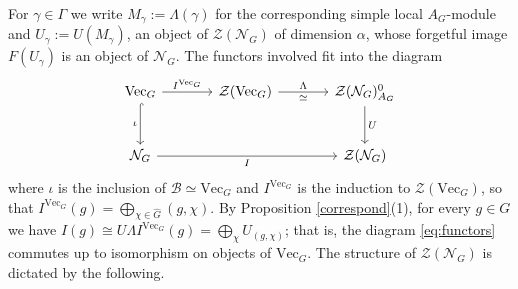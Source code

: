 \documentclass[10pt]{article}
\theoremstyle{plain}
\theoremstyle{definition}
\theoremstyle{plain}
\begin{document}
\par For $\gamma\in\Gamma$ we write $M_\gamma:=\Lambda(\gamma)$ for the corresponding simple local $A_G$-module and $U_\gamma:=U(M_\gamma)$, an object of $\mathcal{Z}(\mathcal{N}_G)$ of dimension $\alpha$, whose forgetful image $F(U_\gamma)$ is an object of $\mathcal{N}_G$. The functors involved fit into the diagram
\begin{equation}\label{eq:functors}
\begin{tikzcd}[column sep=large, row sep=large]
\mathrm{Vec}_G \arrow[r, "I^{\mathrm{Vec}_G}"] \arrow[d, hook, "\iota"'] & \mathcal{Z}(\mathrm{Vec}_G) \arrow[r, "\Lambda", "\simeq"'] & \mathcal{Z}(\mathcal{N}_G)^0_{A_G} \arrow[d, "U"] \\
\mathcal{N}_G \arrow[rr, "I"'] & & \mathcal{Z}(\mathcal{N}_G)
\end{tikzcd}
\end{equation}
where $\iota$ is the inclusion of $\mathcal{B}\simeq\mathrm{Vec}_G$ and $I^{\mathrm{Vec}_G}$ is the induction to $\mathcal{Z}(\mathrm{Vec}_G)$, so that $I^{\mathrm{Vec}_G}(g)=\bigoplus_{\chi\in\widehat{G}}(g,\chi)$. By Proposition \ref{correspond}(1), for every $g\in G$ we have $I(g)\cong U\Lambda I^{\mathrm{Vec}_G}(g)=\bigoplus_{\chi}U_{(g,\chi)}$; that is, the diagram \eqref{eq:functors} commutes up to isomorphism on objects of $\mathrm{Vec}_G$.  The structure of $\mathcal{Z}(\mathcal{N}_G)$ is dictated by the following.
\end{document}
